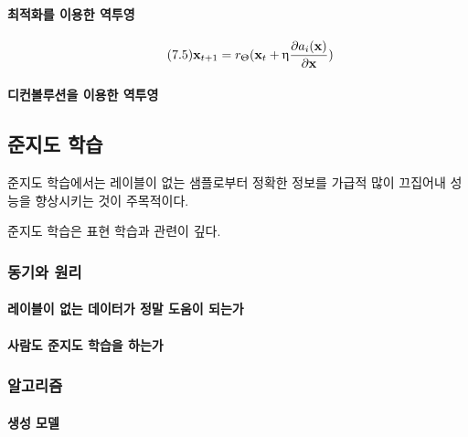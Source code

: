 \documentclass [12pt] {oblivoir}
\let\oldsubsubsection=\subsubsection
\renewcommand{\subsubsection}
{
  \filbreak
  \oldsubsubsection
}
\begin{document}
\paragraph*{최적화를 이용한 역투영}\mbox{}

\begin{equation} \tag{7.5}
  \mathbf{x}_{t+1} = r_{\Uptheta}(\mathbf{x}_{t} + \upeta\frac{\partial a_{i}(\mathbf{x})}{\partial \mathbf{x}})
\end{equation}

\vspace{3mm}

\paragraph*{디컨볼루션을 이용한 역투영}\mbox{}

\vspace{3mm}

\subsection{준지도 학습}

준지도 학습에서는 레이블이 없는 샘플로부터 정확한 정보를 가급적 많이 끄집어내 성능을 향상시키는 것이 주목적이다.

준지도 학습은 표현 학습과 관련이 깊다.

\subsubsection{동기와 원리}

\paragraph*{레이블이 없는 데이터가 정말 도움이 되는가}\mbox{}

\vspace{3mm}

\paragraph*{사람도 준지도 학습을 하는가}\mbox{}

\vspace{3mm}

\subsubsection{알고리즘}

\paragraph*{생성 모델}\mbox{}
\end{document}
